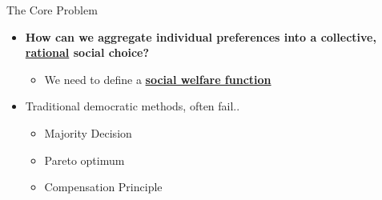 \documentclass{beamer}
\begin{document}
\begin{frame}{The Core Problem}
    \begin{itemize}
        \item \textbf{How can we aggregate individual preferences into a collective, \uline{rational} social choice?}
        \begin{itemize}
            \item[$\Rightarrow$] We need to define a \textbf{\uline{social welfare function}}
        \end{itemize}
        \vspace{0.25 cm}
        \item Traditional democratic methods, often fail..
        \begin{itemize}
            \item Majority Decision
            \item Pareto optimum
            \item Compensation Principle
        \end{itemize}
    \end{itemize}

\end{frame}
\end{document}
